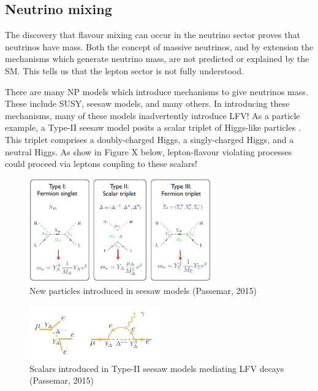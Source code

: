\documentclass[12pt]{thesis}  %
\begin{document}
\subsection{Neutrino mixing}

The discovery that flavour mixing can occur in the neutrino sector \cite{SuperK:1998}\cite{SNO:2002} proves that neutrinos have mass. Both the concept of massive neutrinos, and by extension the mechanisms which generate neutrino mass, are not predicted or explained by the SM. This tells us that the lepton sector is not fully understood.

There are many NP models which introduce mechanisms to give neutrinos mass. These include SUSY, seesaw models, and many others. In introducing these mechanisms, many of these models inadvertently introduce LFV! As a particle example, a Type-II seesaw model posits a scalar triplet of Higgs-like particles \cite{Passemar:2015}. This triplet comprises a doubly-charged Higgs, a singly-charged Higgs, and a neutral Higgs. As show in Figure X below, lepton-flavour violating processes could proceed via leptons coupling to these scalars!


\begin{figure}[h]
\centering
\includegraphics[width=0.7\textwidth]{images/seesaw.png}
\caption{New particles introduced in seesaw models (Passemar, 2015)}
\label{}
\end{figure}

\begin{figure}[h]
\centering
\includegraphics[width=0.5\textwidth]{images/seesaw-lfv-modes.png}
\caption{Scalars introduced in Type-II seesaw models mediating LFV decays (Passemar, 2015)}
\label{}
\end{figure}
\end{document}

